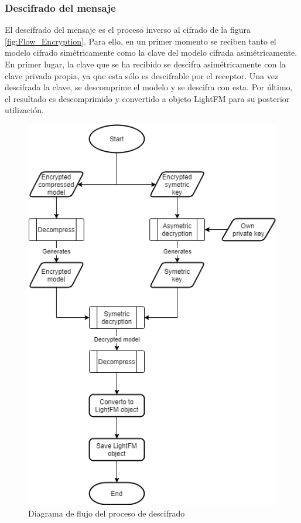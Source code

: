 \subsubsection{Descifrado del mensaje}
El descifrado del mensaje es el proceso inverso al cifrado de la figura \ref{fig:Flow_Encryption}. Para ello, en un primer momento se reciben tanto el modelo cifrado simétricamente como la clave del modelo cifrada asimétricamente. En primer lugar, la clave que se ha recibido se descifra asimétricamente con la clave privada propia, ya que esta sólo es descifrable por el receptor. Una vez descifrada la clave, se descomprime el modelo y se descifra con esta. Por último, el resultado es descomprimido y convertido a objeto LightFM para su posterior utilización. 
\begin{figure}[H]
    \centering
    \includegraphics[height=0.6\textheight]{Figuras/flowchart_decryption.png}    
    \caption{Diagrama de flujo del proceso de descifrado} 
    \label{fig:Flow_Decryption}
\end{figure}